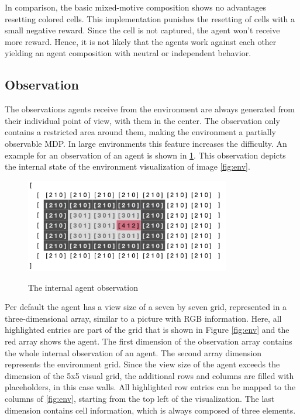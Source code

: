 In comparison, the basic mixed-motive composition shows no advantages resetting colored cells. This implementation punishes the resetting of cells with a small negative reward. Since the cell is not captured, the agent won't receive more reward. Hence, it is not likely that the agents work against each other yielding an agent composition with neutral or independent behavior.

\subsection{Observation}
The observations agents receive from the environment are always generated from their individual point of view, with them in the center. The observation only contains a restricted area around them, making the environment a partially observable MDP. In large environments this feature increases the difficulty.
An example for an observation of an agent is shown in \ref{fig:agent_obs}. This observation depicts the internal state of the environment visualization of image \ref{fig:env}.

\begin{figure}[hpbt]
    \centering
    \includegraphics[width=0.8\textwidth]{pictures/agent_observation}\\
    \caption[Agent Observation]{The internal agent observation}\label{fig:agent_obs}
\end{figure}

Per default the agent has a view size of a seven by seven grid, represented in a three-dimensional array, similar to a picture with RGB information. Here, all highlighted entries are part of the grid that is shown in Figure \ref{fig:env} and the red array shows the agent. The first dimension of the observation array contains the whole internal observation of an agent. The second array dimension represents the environment grid. Since the view size of the agent exceeds the dimension of the 5x5 visual grid, the additional rows and columns are filled with placeholders, in this case walls. All highlighted row entries can be mapped to the columns of \ref{fig:env}, starting from the top left of the visualization. The last dimension contains cell information, which is always composed of three elements. 

